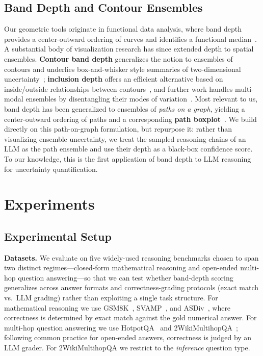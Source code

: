 \documentclass[letterpaper]{article} %
\begin{document}
\subsection{Band Depth and Contour Ensembles}
Our geometric tools originate in functional data analysis, where band depth
provides a center-outward ordering of curves and identifies a functional
median~\citep{lopezpintado2009banddepth}. A substantial body of visualization
research has since extended depth to spatial ensembles. \textbf{Contour band depth}
generalizes the notion to ensembles of contours and underlies box-and-whisker
style summaries of two-dimensional uncertainty~\citep{santer2023contourbanddepth};
\textbf{inclusion depth} offers an efficient alternative based on inside/outside
relationships between contours~\citep{chavesdeplaza2024inclusiondepth}, and
further work handles multi-modal ensembles by disentangling their modes of
variation~\citep{chavesdeplaza2024multimodal}. Most relevant to us, band depth has
been generalized to ensembles of \emph{paths on a graph}, yielding a
center-outward ordering of paths and a corresponding \textbf{path
boxplot}~\citep{raj2017pathboxplots}. We build directly on this path-on-graph
formulation, but repurpose it: rather than visualizing ensemble uncertainty, we
treat the sampled reasoning chains of an LLM as the path ensemble and use their
depth as a black-box confidence score. To our knowledge, this is the first
application of band depth to LLM reasoning for uncertainty quantification.

\section{Experiments}
\label{sec:exp}

\subsection{Experimental Setup}
\label{sec:exp:setup}

\textbf{Datasets.} We evaluate on five widely-used reasoning benchmarks chosen to
span two distinct regimes---closed-form mathematical reasoning and open-ended
multi-hop question answering---so that we can test whether band-depth scoring
generalizes across answer formats and correctness-grading protocols (exact match
vs.\ LLM grading) rather than exploiting a single task structure.
For mathematical reasoning we use GSM8K~\citep{cobbe2021gsm8k},
SVAMP~\citep{patel2021svamp}, and ASDiv~\citep{miao2020asdiv}, where correctness
is determined by exact match against the gold numerical answer. For multi-hop
question answering we use HotpotQA~\citep{yang2018hotpotqa} and
2WikiMultihopQA~\citep{ho2020wikimultihop}; following common practice for
open-ended answers, correctness is judged by an LLM grader. For 2WikiMultihopQA
we restrict to the \emph{inference} question type.
\end{document}
